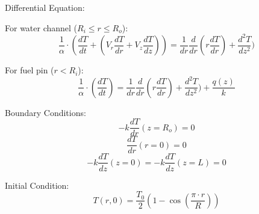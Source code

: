 \documentclass[12pt,letterpaper]{article}
\begin{document}
\pagebreak
Differential Equation:

For water channel ($R_i \leq r \leq R_o$):
\[\frac{1}{\alpha} \cdot (\frac{dT}{dt} + (V_r \frac{dT}{dr} + V_z \frac{dT}{dz})) =
  \frac{1}{dr} \frac{d}{dr} (r \frac{dT}{dr}) + \frac{d^2T}{dz^2})\]

For fuel pin ($r < R_i$):
\[\frac{1}{\alpha} \cdot (\frac{dT}{dt}) =
  \frac{1}{dr} \frac{d}{dr} (r \frac{dT}{dr}) + \frac{d^2T}{dz^2}) + \frac{q(z)}{k}\]

Boundary Conditions:
\[-k \frac{dT}{dr}(z=R_o) = 0 \]
\[\frac{dT}{dr}(r=0) = 0\]
\[-k \frac{dT}{dz}(z=0) = -k \frac{dT}{dz}(z=L) = 0 \]
 

Initial Condition:
\[T(r,0) = \frac{T_0}{2} (1-\cos{(\frac{\pi \cdot r}{R})}) \]






\pagebreak
\end{document}
